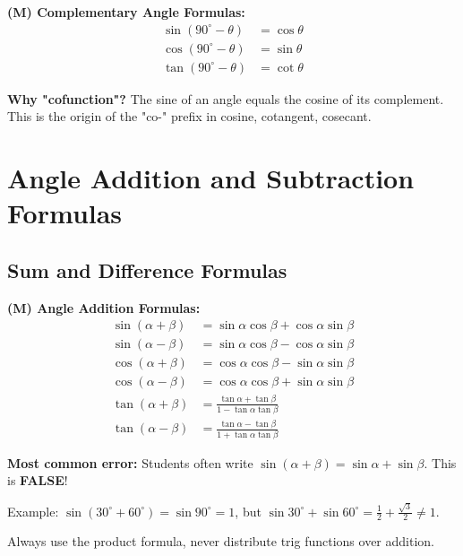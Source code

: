 \documentclass[12pt]{extarticle}
\begin{document}
\begin{theorembox}
\textbf{(M) Complementary Angle Formulas:}
\begin{align*}
\sin(90^\circ - \theta) &= \cos\theta \\
\cos(90^\circ - \theta) &= \sin\theta \\
\tan(90^\circ - \theta) &= \cot\theta
\end{align*}
\end{theorembox}

\begin{remarkbox}
\textbf{Why "cofunction"?} The sine of an angle equals the cosine of its complement. This is the origin of the "co-" prefix in cosine, cotangent, cosecant.
\end{remarkbox}

\section{Angle Addition and Subtraction Formulas}

\subsection{Sum and Difference Formulas}

\begin{theorembox}
\textbf{(M) Angle Addition Formulas:}
\begin{align}
\sin(\alpha + \beta) &= \sin\alpha\cos\beta + \cos\alpha\sin\beta \\
\sin(\alpha - \beta) &= \sin\alpha\cos\beta - \cos\alpha\sin\beta \\
\cos(\alpha + \beta) &= \cos\alpha\cos\beta - \sin\alpha\sin\beta \\
\cos(\alpha - \beta) &= \cos\alpha\cos\beta + \sin\alpha\sin\beta \\
\tan(\alpha + \beta) &= \frac{\tan\alpha + \tan\beta}{1 - \tan\alpha\tan\beta} \\
\tan(\alpha - \beta) &= \frac{\tan\alpha - \tan\beta}{1 + \tan\alpha\tan\beta}
\end{align}
\end{theorembox}

\begin{warningbox}
\textbf{Most common error:} Students often write $\sin(\alpha + \beta) = \sin\alpha + \sin\beta$. This is \textbf{FALSE}!

Example: $\sin(30^\circ + 60^\circ) = \sin 90^\circ = 1$, but $\sin 30^\circ + \sin 60^\circ = \frac{1}{2} + \frac{\sqrt{3}}{2} \neq 1$.

Always use the product formula, never distribute trig functions over addition.
\end{warningbox}
\end{document}
